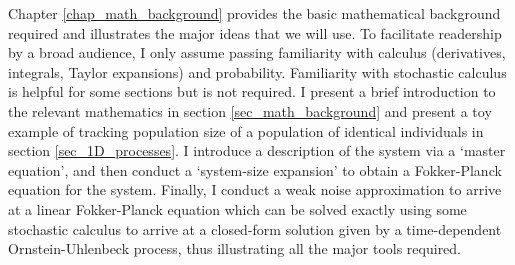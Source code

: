 Chapter \ref{chap_math_background} provides the basic mathematical background required and illustrates the major ideas that we will use. To facilitate readership by a broad audience, I only assume passing familiarity with calculus (derivatives, integrals, Taylor expansions) and probability. Familiarity with stochastic calculus is helpful for some sections but is not required. I present a brief introduction to the relevant mathematics in section \ref{sec_math_background} and present a toy example of tracking population size of a population of identical individuals in section \ref{sec_1D_processes}. I introduce a description of the system via a `master equation', and then conduct a `system-size expansion' to obtain a Fokker-Planck equation for the system. Finally, I conduct a weak noise approximation to arrive at a linear Fokker-Planck equation which can be solved exactly using some stochastic calculus to arrive at a closed-form solution given by a time-dependent Ornstein-Uhlenbeck process, thus illustrating all the major tools required.

